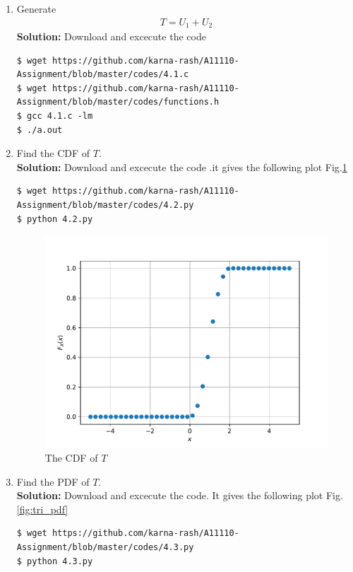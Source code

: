 \documentclass[journal,12pt,twocolumn]{IEEEtran}
\renewcommand\thesection{\arabic{section}}
\begin{document}
\begin{enumerate}[label=\thesection.\arabic*
,ref=\thesection.\theenumi]
%
\item Generate 
	\begin{align}
		T = U_1+U_2
	\end{align}
	\textbf{Solution:}
	Download and excecute the code
	\begin{lstlisting}
$ wget https://github.com/karna-rash/A11110-Assignment/blob/master/codes/4.1.c
$ wget https://github.com/karna-rash/A11110-Assignment/blob/master/codes/functions.h
$ gcc 4.1.c -lm 
$ ./a.out 
	\end{lstlisting}
\item Find the CDF of $T$.\\
\textbf{Solution:}
Download and excecute the code .it gives the following plot Fig.\ref{fig:tri_cdf}
\begin{lstlisting}
$ wget https://github.com/karna-rash/A11110-Assignment/blob/master/codes/4.2.py
$ python 4.2.py
	\end{lstlisting}
	\begin{figure}
\centering
\includegraphics[width=\columnwidth]{./figs/tri_cdf}
\caption{The CDF of $T$}
\label{fig:tri_cdf}
\end{figure}
\item Find the PDF of $T$.\\
\textbf{Solution:}
Download and excecute the code. It gives the following plot Fig.\ref{fig:tri_pdf}
\begin{lstlisting}
$ wget https://github.com/karna-rash/A11110-Assignment/blob/master/codes/4.3.py
$ python 4.3.py
\end{lstlisting}

\end{enumerate}
\end{document}
